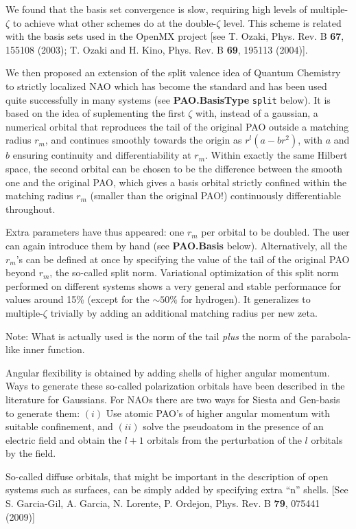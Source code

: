 \documentclass[11pt]{article}
\begin{document}
  We found that the basis set convergence is slow, requiring high levels
of multiple-$\zeta$ to achieve what other schemes do at the double-$\zeta$
level.
  This scheme is related with the basis sets used in the OpenMX project
[see T. Ozaki, Phys. Rev. B {\bf 67}, 155108 (2003); T. Ozaki and H. Kino,
Phys. Rev. B {\bf 69}, 195113 (2004)].

  We then proposed an extension of the split valence idea of Quantum Chemistry
to strictly localized NAO which has become the standard and has been used
quite successfully in many systems (see {\bf PAO.BasisType} {\tt split} below).
  It is based on the idea of suplementing the first $\zeta$ with, instead of
a gaussian, a numerical orbital that reproduces the tail of the original PAO
outside a matching radius $r_{m}$, and continues smoothly towards the origin as
$r^l(a-br^2)$, with $a$ and $b$ ensuring continuity and differentiability
at $r_{m}$.
  Within exactly the same
Hilbert space, the second orbital can be chosen to be the difference between
the smooth one and the original PAO, which gives a basis orbital strictly
confined within the matching radius $r_{m}$ (smaller than the
original PAO!) continuously differentiable throughout.

  Extra parameters have thus appeared: one $r_m$ per orbital to be doubled.
The user can again introduce them by hand (see {\bf PAO.Basis} below).
Alternatively, all the $r_m$'s can be defined at once by specifying
the value of the tail of the original PAO beyond $r_m$, the so-called
split norm. Variational optimization
of this split norm performed on different systems
shows a very general and stable performance for values around
15\% (except for the $\sim 50\%$ for hydrogen).
  It generalizes to multiple-$\zeta$ trivially by adding an additional
matching radius per new zeta.

Note: What is actually used is the norm of the tail {\em plus} the
norm of the parabola-like inner function.

Angular flexibility is obtained by adding shells of higher angular
momentum.  Ways to generate these so-called polarization orbitals have
been described in the literature for Gaussians.  For NAOs there are
two ways for {\sc Siesta} and {\sc Gen-basis} to generate them: $(i)$
Use atomic PAO's of higher angular momentum with suitable confinement,
and $(ii)$ solve the pseudoatom in the presence of an electric field
and obtain the $l+1$ orbitals from the perturbation of the $l$
orbitals by the field.

So-called diffuse orbitals, that might be important in the description
of open systems such as surfaces, can be simply added by specifying
extra ``n'' shells. [See S. Garcia-Gil, A. Garcia, N. Lorente,
  P. Ordejon, Phys. Rev. B {\bf 79}, 075441 (2009)]
\end{document}

